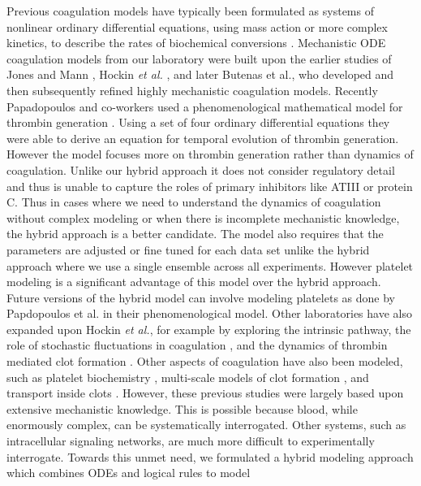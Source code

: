 \documentclass[processes,article,received,moreauthors,pdftex,12pt,a4paper]{mdpi}
\begin{document}
Previous coagulation models have typically been formulated as systems of nonlinear ordinary differential equations, 
using mass action or more complex kinetics, to describe the rates of biochemical conversions \citep{Khanin:1989aa,Willems:1991aa,Baldwin:1994aa,Leipold:1995aa,Kuharsky:2001aa}.
Mechanistic ODE coagulation models from our laboratory \citep{Luan:2007aa,2010_luan_varner_MolBioSys} 
were built upon the earlier studies of Jones and Mann \citep{Jones:1994aa}, Hockin \emph{et al.} \citep{Hockin:2002aa}, and later Butenas et al., \citep{Butenas:2004aa}
who developed and then subsequently refined highly mechanistic coagulation models. Recently Papadopoulos and co-workers used a phenomenological  mathematical model for thrombin generation \cite{Atkin:2014}. Using a set of four ordinary differential equations they were able to derive an equation for temporal evolution of thrombin generation. However the model focuses more on thrombin generation rather than dynamics of coagulation. Unlike our hybrid approach it does not consider regulatory detail and thus is unable to capture the roles of primary inhibitors like ATIII or protein C. Thus in cases where we need to understand the dynamics of coagulation without complex modeling or when there is incomplete mechanistic knowledge, the hybrid approach is a better candidate. The model also requires that the parameters are adjusted or fine tuned for each data set unlike the hybrid approach where we use a single ensemble across all experiments. However platelet modeling is a significant advantage of this model over the hybrid approach.  Future versions of the hybrid model can involve modeling platelets as done by Papdopoulos et al. in their phenomenological model. Other laboratories have also expanded upon Hockin \emph{et al.}, for example by exploring the intrinsic pathway, the role of stochastic fluctuations in coagulation \citep{Lo:2005aa}, and the dynamics of thrombin mediated clot formation \citep{Chatterjee:2010aa}. 
Other aspects of coagulation have also been modeled, such as platelet biochemistry \citep{Stalker:2013aa}, 
multi-scale models of clot formation \citep{Leiderman:2014aa, Bannish:2014ab}, and transport inside clots \citep{Voronov:2013aa}.
However, these previous studies were largely based upon extensive mechanistic knowledge. 
This is possible because blood, while enormously complex, can be systematically interrogated.
Other systems, such as intracellular signaling networks, are much more difficult to experimentally interrogate.  
Towards this unmet need, we formulated a hybrid modeling approach which combines ODEs and logical rules to model 
\end{document}
